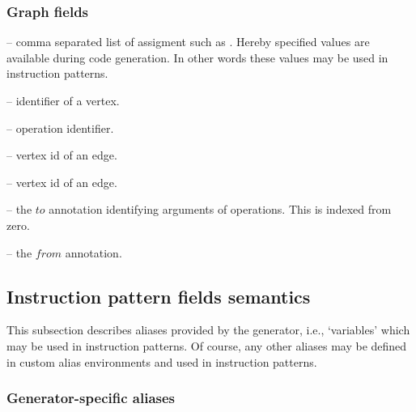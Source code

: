 \subsubsection{Graph fields}
\begin{description}
\item{} -- comma separated list of assigment such as . Hereby specified values are available during code generation. In other words these values may be used in instruction patterns.
\item{} -- identifier of a vertex.
\item{} -- operation identifier.
\item{} -- vertex id of an edge.
\item{} -- vertex id of an edge.
\item{} -- the $to$ annotation identifying arguments of operations. This is indexed from zero.
\item{} -- the $from$ annotation.
\end{description}

\subsection{Instruction pattern fields semantics}

This subsection describes aliases provided by the generator, i.e., `variables' which may be used in instruction patterns. Of course, any other aliases may be defined in custom alias environments and used in instruction patterns.


\subsubsection{Generator-specific aliases}

